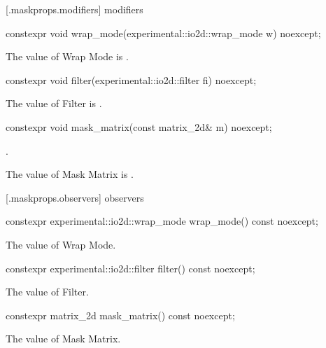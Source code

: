  [\iotwod.maskprops.modifiers] { modifiers}

\begin{itemdecl}
constexpr void wrap_mode(experimental::io2d::wrap_mode w) noexcept;
\end{itemdecl}
\begin{itemdescr}
\pnum
\effects
The value of Wrap Mode is .
\end{itemdescr}

\begin{itemdecl}
constexpr void filter(experimental::io2d::filter fi) noexcept;
\end{itemdecl}
\begin{itemdescr}
\pnum
\effects
The value of Filter is .
\end{itemdescr}

\begin{itemdecl}
constexpr void mask_matrix(const matrix_2d& m) noexcept;
\end{itemdecl}
\begin{itemdescr}
\pnum
\requires
{}.

\pnum
\effects
The value of Mask Matrix is .
\end{itemdescr}

 [\iotwod.maskprops.observers] { observers}

\begin{itemdecl}
constexpr experimental::io2d::wrap_mode wrap_mode() const noexcept;
\end{itemdecl}
\begin{itemdescr}
\pnum
\returns
The value of Wrap Mode.
\end{itemdescr}

\begin{itemdecl}
constexpr experimental::io2d::filter filter() const noexcept;
\end{itemdecl}
\begin{itemdescr}
\pnum
\returns
The value of Filter.
\end{itemdescr}

\begin{itemdecl}
constexpr matrix_2d mask_matrix() const noexcept;
\end{itemdecl}
\begin{itemdescr}
\pnum
\returns
The value of Mask Matrix.
\end{itemdescr}

